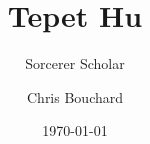 ﻿\documentclass[10pt,twocolumn,twoside]{book}
\title{Tepet Hu}
\subtitle{Sorcerer Scholar}
\author{Chris Bouchard}
\date{\ddmmmyyyydate\today}
\begin{document}
\frontmatter
{}
\pagestyle{empty}

\begin{titlepage}
    \MakeExaltedTitle
\end{titlepage}

\cleardoublepage



\mainmatter
\pagestyle{main}




\end{document}
